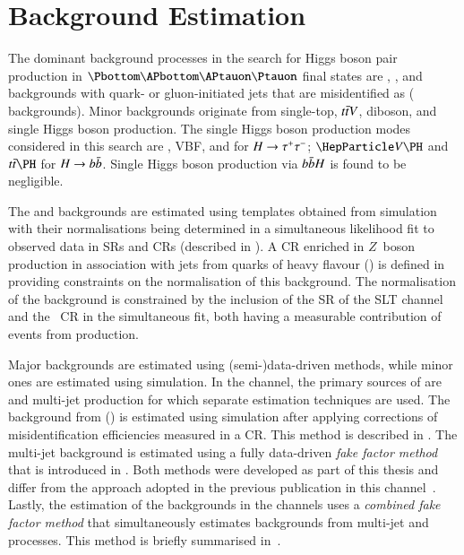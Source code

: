 \section{Background Estimation}%
\label{sec:background_estimation}

The dominant background processes in the search for Higgs boson pair production
in $\bbtautau$ final states are \Zjets, \ttbar, and backgrounds with quark- or
gluon-initiated jets that are misidentified as \tauhadvis (\faketauhadvis
backgrounds).
Minor backgrounds originate from single-top, $t\bar{t} V$, diboson, and single
Higgs boson production.  The single Higgs boson production modes considered in
this search are \ggF, VBF, \VH and \ttH for $H \to \tau^{+} \tau^{-}$; $\VH$ and $\ttH$
for $H \to b\bar{b}$. Single Higgs boson production via $b\bar{b} H$ is found to be
negligible.

The \Zjets and \ttbar backgrounds are estimated using templates obtained from
simulation with their normalisations being determined in a simultaneous
likelihood fit to observed data in SRs and CRs (described in
). A CR enriched in $Z$~boson production in
association with jets from quarks of heavy flavour (\ZHF) is defined in
 providing constraints on the normalisation of this
background. The normalisation of the \ttbar background is constrained by the
inclusion of the SR of the \lephad SLT channel and the \ZHF~CR in the
simultaneous fit, both having a measurable contribution of events from \ttbar
production.

Major \faketauhadvis backgrounds are estimated using (semi-)data-driven methods,
while minor ones are estimated using simulation. In the \hadhad channel, the
primary sources of \faketauhadvis are \ttbar and multi-jet production for which
separate estimation techniques are used. The \faketauhadvis background from
\ttbar (\ttbarFakes) is estimated using simulation after applying corrections of
\jettotauhadvis misidentification efficiencies measured in a CR. This method is
described in . The multi-jet background is
estimated using a fully data-driven \emph{fake factor method} that is introduced
in . Both methods were developed as part of this thesis
and differ from the approach adopted in the previous publication in this
channel~\cite{HIGG-2016-16-witherratum}. Lastly, the estimation of the
\faketauhadvis backgrounds in the \lephad channels uses a \emph{combined fake
  factor method} that simultaneously estimates \faketauhadvis backgrounds from
multi-jet and \ttbar processes. This method is briefly summarised
in~.


